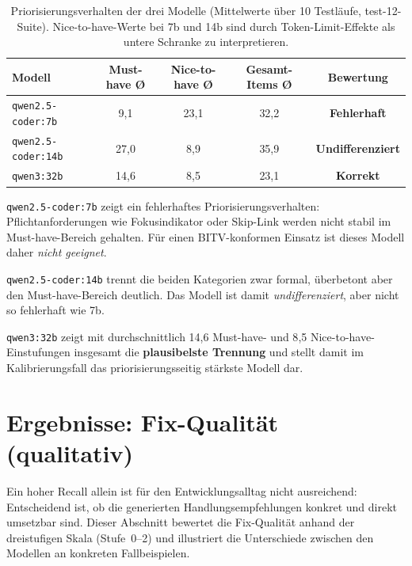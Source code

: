 \begin{table}[htbp]
\centering
\small
\renewcommand{\arraystretch}{1.15}
\begin{tabular}{@{}lcccc@{}}
\toprule
\textbf{Modell} & \textbf{Must-have Ø} & \textbf{Nice-to-have Ø} & \textbf{Gesamt-Items Ø} & \textbf{Bewertung} \\
\midrule
\texttt{qwen2.5-coder:7b}  & 9,1  & 23,1 & 32,2 & \textbf{Fehlerhaft} \\
\texttt{qwen2.5-coder:14b} & 27,0 & 8,9  & 35,9 & \textbf{Undifferenziert} \\
\texttt{qwen3:32b}         & 14,6 & 8,5  & 23,1 & \textbf{Korrekt} \\
\bottomrule
\end{tabular}
\caption[Priorisierungsverhalten der drei Modelle (test-12)]{Priorisierungsverhalten der drei Modelle (Mittelwerte über 10 Testläufe, test-12-Suite). Nice-to-have-Werte bei 7b und 14b sind durch Token-Limit-Effekte als untere Schranke zu interpretieren.}
\label{tab:priorisierungsqualitaet}
\end{table}

\texttt{qwen2.5-coder:7b} zeigt ein fehlerhaftes Priorisierungsverhalten: Pflichtanforderungen wie Fokus\-indikator oder Skip-Link werden nicht stabil im Must-have-Bereich gehalten. Für einen \ac{BITV}-konformen Einsatz ist dieses Modell daher \textit{nicht geeignet}.

\texttt{qwen2.5-coder:14b} trennt die beiden Kategorien zwar formal, überbetont aber den Must-have-Bereich deutlich. Das Modell ist damit \textit{undifferenziert}, aber nicht so fehlerhaft wie 7b.

\texttt{qwen3:32b} zeigt mit durchschnittlich 14{,}6 Must-have- und 8{,}5 Nice-to-have-Einstufungen insgesamt die \textbf{plausibelste Trennung} und stellt damit im Kalibrierungsfall das priorisierungsseitig stärkste Modell dar.

\section{Ergebnisse: Fix-Qualität (qualitativ)}
\label{sec:ergebnisse_qualitaet}

Ein hoher Recall allein ist für den Entwicklungsalltag nicht ausreichend: Entscheidend ist, ob die generierten Handlungsempfehlungen konkret und direkt umsetzbar sind. Dieser Abschnitt bewertet die Fix-Qualität anhand der dreistufigen Skala (Stufe~0--2) und illustriert die Unterschiede zwischen den Modellen an konkreten Fallbeispielen.

